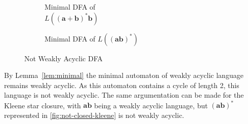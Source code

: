 \begin{figure}[t]
\centering 
	\begin{subfigure}{.30\textwidth}	
		\centering 
    	\centering 
    	\caption{Minimal DFA of \\ $L(\bm{(a + b)^{*}b})$}\label{fig:not-closed-concat}
    \end{subfigure}
    \begin{subfigure}{.60\textwidth}
	\centering 
    	\caption{Minimal DFA of $L(\bm{(ab)^{*}})$}\label{fig:not-closed-kleene}
    \end{subfigure}
     \caption{Not Weakly Acyclic DFA}
\end{figure}

By Lemma~\autoref{lem:minimal} the minimal automaton of weakly acyclic language remains weakly acyclic. As this automaton contains a cycle of length 2, this language is not weakly acyclic. The same argumentation can be made for the Kleene star closure, with $\bm{ab}$ being a weakly acyclic language, but $\bm{(ab)^{*}}$ represented in \autoref{fig:not-closed-kleene} is not weakly acyclic. 


